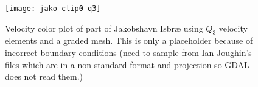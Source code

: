 
\begin{figure}
  \centering\texttt{[image: jako-clip0-q3]}
  \caption{Velocity color plot of part of Jakobshavn Isbr{\ae} using $Q_3$ velocity elements and a graded mesh. This is only a placeholder because of incorrect boundary conditions (need to sample from Ian Joughin's files which are in a non-standard format and projection so GDAL does not read them.)}\label{fig:jako-clip}
\end{figure}

